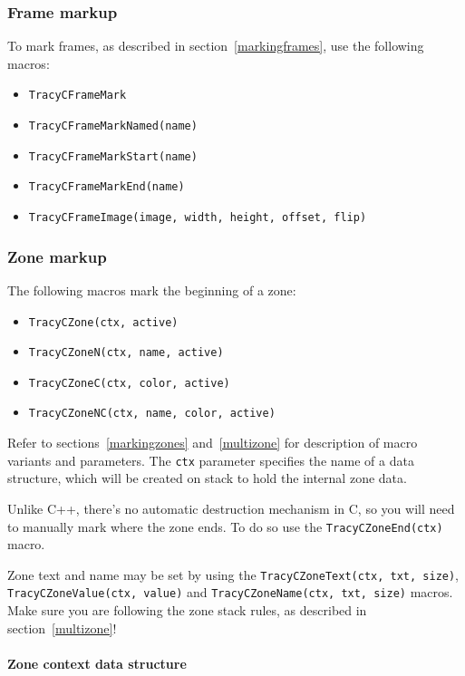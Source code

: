 \documentclass[hidelinks,titlepage,a4paper]{article}
\begin{document}
\subsubsection{Frame markup}

To mark frames, as described in section~\ref{markingframes}, use the following macros:

\begin{itemize}
\item \texttt{TracyCFrameMark}
\item \texttt{TracyCFrameMarkNamed(name)}
\item \texttt{TracyCFrameMarkStart(name)}
\item \texttt{TracyCFrameMarkEnd(name)}
\item \texttt{TracyCFrameImage(image, width, height, offset, flip)}
\end{itemize}

\subsubsection{Zone markup}
\label{czonemarkup}

The following macros mark the beginning of a zone:

\begin{itemize}
\item \texttt{TracyCZone(ctx, active)}
\item \texttt{TracyCZoneN(ctx, name, active)}
\item \texttt{TracyCZoneC(ctx, color, active)}
\item \texttt{TracyCZoneNC(ctx, name, color, active)}
\end{itemize}

Refer to sections~\ref{markingzones} and~\ref{multizone} for description of macro variants and parameters. The \texttt{ctx} parameter specifies the name of a data structure, which will be created on stack to hold the internal zone data.

Unlike C++, there's no automatic destruction mechanism in C, so you will need to manually mark where the zone ends. To do so use the \texttt{TracyCZoneEnd(ctx)} macro.

Zone text and name may be set by using the \texttt{TracyCZoneText(ctx, txt, size)}, \texttt{TracyCZoneValue(ctx, value)} and \texttt{TracyCZoneName(ctx, txt, size)} macros. Make sure you are following the zone stack rules, as described in section~\ref{multizone}!

\paragraph{Zone context data structure}
\label{zonectx}
\end{document}
